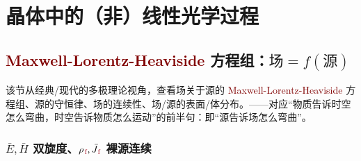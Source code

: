 \chapter{晶体中的（非）线性光学过程}\label{chap:N/LCO}

\vspace*{-8.5em}

\section{\textcolor{Maroon}{Maxwell-Lorentz-Heaviside} 方程组：$\text{场} = f(\text{源})$}\label{sec:maxwell}

该节从经典/现代的多极理论视角，查看场关于源的 \textcolor{Maroon}{Maxwell-Lorentz-Heaviside} 方程组、源的守恒律、场的连续性、场/源的表面/体分布。——对应“物质告诉时空怎么弯曲，时空告诉物质怎么运动”的前半句：即“源告诉场怎么弯曲”。

\vspace*{-5.0em}

\subsection{$\bar{E},\bar{H}$ 双旋度、${\rho}_{\;\!\textcolor{Maroon}{\text{f}}}, \bar{J}_{\;\!\textcolor{Maroon}{\text{f}}}$ 裸源连续}\label{ssec:EHpJf}

